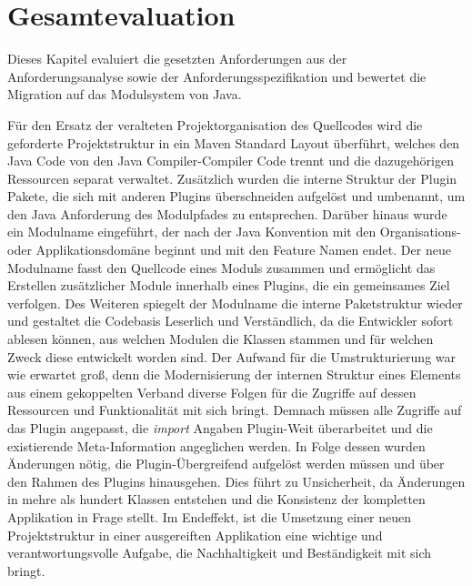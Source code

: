 \chapter{Gesamtevaluation}
Dieses Kapitel evaluiert die gesetzten Anforderungen aus der Anforderungsanalyse sowie der Anforderungsspezifikation und bewertet die Migration auf das Modulsystem von Java.\bigbreak	

Für den Ersatz der veralteten Projektorganisation des Quellcodes wird die geforderte Projektstruktur in ein Maven Standard Layout überführt, welches den Java Code von den Java Compiler-Compiler Code trennt und die dazugehörigen Ressourcen separat verwaltet. Zusätzlich wurden die interne Struktur der Plugin Pakete, die sich mit anderen Plugins überschneiden aufgelöst und umbenannt, um den Java Anforderung des Modulpfades zu entsprechen. Darüber hinaus wurde ein Modulname eingeführt, der nach der Java Konvention mit den Organisations- oder Applikationsdomäne beginnt und mit den Feature Namen endet. Der neue Modulname fasst den Quellcode eines Moduls zusammen und ermöglicht das Erstellen zusätzlicher Module innerhalb eines Plugins, die ein gemeinsames Ziel verfolgen. Des Weiteren spiegelt der Modulname die interne Paketstruktur wieder und gestaltet die Codebasis Leserlich und Verständlich, da die Entwickler sofort ablesen können, aus welchen Modulen die Klassen stammen und für welchen Zweck diese entwickelt worden sind.\newline
Der Aufwand für die Umstrukturierung war wie erwartet groß, denn die Modernisierung der internen Struktur eines Elements aus einem gekoppelten Verband diverse Folgen für die Zugriffe auf dessen Ressourcen und Funktionalität mit sich bringt. Demnach müssen alle Zugriffe auf das Plugin angepasst, die \textit{import} Angaben Plugin-Weit überarbeitet und die existierende Meta-Information angeglichen werden. In Folge dessen wurden Änderungen nötig, die Plugin-Übergreifend aufgelöst werden müssen und über den Rahmen des Plugins hinausgehen. Dies führt zu Unsicherheit, da Änderungen in mehre als hundert Klassen entstehen und die Konsistenz der kompletten Applikation in Frage stellt. \newline
Im Endeffekt, ist die Umsetzung einer neuen Projektstruktur in einer ausgereiften Applikation eine wichtige und verantwortungsvolle Aufgabe, die  Nachhaltigkeit und Beständigkeit mit sich bringt.\bigbreak    

